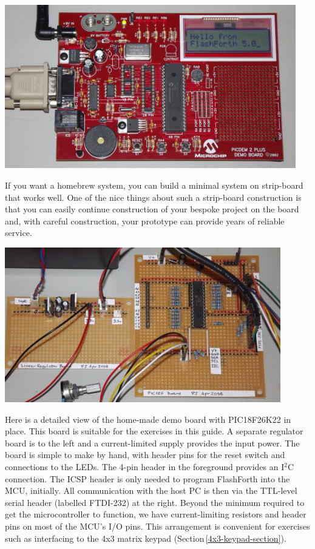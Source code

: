 \documentclass[12pt,a4paper]{article}
\begin{document}
\bigskip
\noindent
{
\includegraphics[width=0.95\textwidth]{../figs/picdem2plus-with-46k22-flashforth-5.jpeg}
\label{lcd-on-picdem2-board}
}

\bigskip\noindent
If you want a homebrew system, 
you can build a minimal system on strip-board that works well.
One of the nice things about such a strip-board construction is that you can
easily continue construction of your bespoke project on the board and,
with careful construction, your prototype can provide years of reliable service. 

\medskip
\centerline{
\includegraphics[width=0.9\textwidth]{../figs/pic18f26k22-demo-board-with-regulator-board-2014.jpeg}
}

\medskip\noindent
Here is a detailed view of the home-made demo board with PIC18F26K22 in place.
This board is suitable for the exercises in this guide.
A separate regulator board is to the left and a current-limited supply provides the 
input power.
The board is simple to make by hand, with header pins for the reset switch and connections to the LEDs.
The 4-pin header in the foreground provides an I$^2$C connection.
The ICSP header is only needed to program FlashForth into the MCU, initially.
All communication with the host PC is then via the TTL-level serial header (labelled FTDI-232) at the right.
Beyond the minimum required to get the microcontroller to function, 
we have current-limiting resistors and header pins on most of the MCU's I/O pins.
This arrangement is convenient for exercises such as interfacing to the 4x3 matrix keypad
(Section\,\ref{4x3-keypad-section}).
\end{document}
